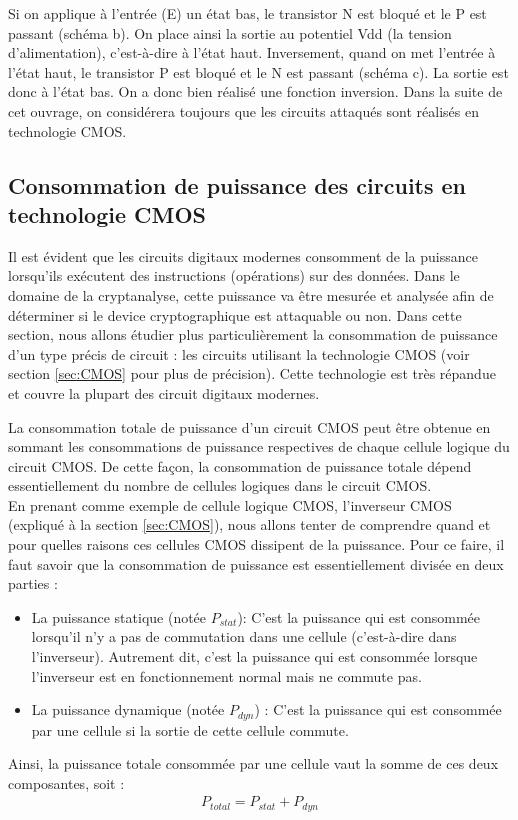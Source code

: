 \documentclass[oneside]{book}
\begin{document}
Si on applique à l'entrée (E) un état bas, le transistor N est bloqué et le P est passant (schéma b). On place ainsi la sortie au potentiel Vdd (la tension d'alimentation), c'est-à-dire à l'état haut. Inversement, quand on met l'entrée à l'état haut, le transistor P est bloqué et le N est passant (schéma c). La sortie est donc à l'état bas. On a donc bien réalisé une fonction inversion. Dans la suite de cet ouvrage, on considérera toujours que les circuits attaqués sont réalisés en technologie CMOS.


\subsection{Consommation de puissance des circuits en technologie CMOS}
\label{sec:puissance}

Il est évident que les circuits digitaux modernes consomment de la puissance lorsqu'ils exécutent des instructions (opérations) sur des données. Dans le domaine de la cryptanalyse, cette puissance va être mesurée et analysée afin de déterminer si le device cryptographique est attaquable ou non. Dans cette section, nous allons étudier plus particulièrement la consommation de puissance d'un type précis de circuit : les circuits utilisant la technologie CMOS (voir section \ref{sec:CMOS} pour plus de précision). Cette technologie est très répandue et couvre la plupart des circuit digitaux modernes. 

La consommation totale de puissance d'un circuit CMOS peut être obtenue en sommant les consommations de puissance respectives de chaque cellule logique du circuit CMOS. De cette façon, la consommation de puissance totale dépend essentiellement du nombre de cellules logiques dans le circuit CMOS. \\
En prenant comme exemple de cellule logique CMOS, l'inverseur CMOS (expliqué à la section \ref{sec:CMOS}), nous allons tenter de comprendre quand et pour quelles raisons ces cellules CMOS dissipent de la puissance. Pour ce faire, il faut savoir que la consommation de puissance est essentiellement divisée en deux parties : 
\begin{itemize}
\item La puissance statique (notée $P_{stat}$): C'est la puissance qui est consommée lorsqu'il n'y a pas de commutation dans une cellule (c'est-à-dire dans l'inverseur). Autrement dit, c'est la puissance qui est consommée lorsque l'inverseur est en fonctionnement normal mais ne commute pas.
\item La puissance dynamique (notée $P_{dyn}$) : C'est la puissance qui est consommée par une cellule si la sortie de cette cellule commute. 
\end{itemize}
Ainsi, la puissance totale consommée par une cellule vaut la somme de ces deux composantes, soit :
\begin{gather}
	P_{total} = P_{stat} + P_{dyn}
\end{gather}
\end{document}
